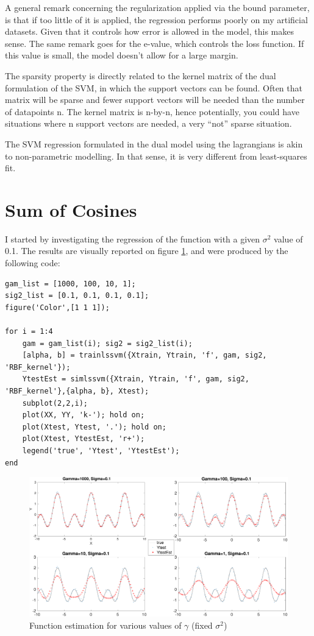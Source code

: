\documentclass[11pt, a4paper]{article}
\begin{document}
A general remark concerning the regularization applied via the bound
parameter, is that if too little of it is applied, the regression
performs poorly on my artificial datasets. Given that it controls how
error is allowed in the model, this makes sense. The same remark goes
for the e-value, which controls the loss function. If this value is
small, the model doesn't allow for a large margin.

The sparsity property is directly related to the kernel matrix of the
dual formulation of the SVM, in which the support vectors can be
found. Often that matrix will be sparse and fewer support vectors will
be needed than the number of datapoints n. The kernel matrix is
n-by-n, hence potentially, you could have situations where n support
vectors are needed, a very ``not'' sparse situation. 

The SVM regression formulated in the dual model using the lagrangians
is akin to non-parametric modelling. In that sense, it is very
different from least-squares fit.

\newpage
\section{Sum of Cosines}

I started by investigating the regression of the function with a given
$\sigma^2$ value of 0.1. The results are visually reported on figure
\ref{fig:sumcos1}, and were produced by the following code:

\begin{lstlisting}
gam_list = [1000, 100, 10, 1];
sig2_list = [0.1, 0.1, 0.1, 0.1];
figure('Color',[1 1 1]);

for i = 1:4
    gam = gam_list(i); sig2 = sig2_list(i);
    [alpha, b] = trainlssvm({Xtrain, Ytrain, 'f', gam, sig2, 'RBF_kernel'});
    YtestEst = simlssvm({Xtrain, Ytrain, 'f', gam, sig2, 'RBF_kernel'},{alpha, b}, Xtest);
    subplot(2,2,i);
    plot(XX, YY, 'k-'); hold on; 
    plot(Xtest, Ytest, '.'); hold on; 
    plot(Xtest, YtestEst, 'r+');
    legend('true', 'Ytest', 'YtestEst');
end
\end{lstlisting}

\begin{figure}[H]
    \centering
    \includegraphics[scale=.40]{sumcos1.pdf}
    \caption{Function estimation for various values of $\gamma$ (fixed
      $\sigma^2$)}
    \label{fig:sumcos1}
\end{figure}
\end{document}
